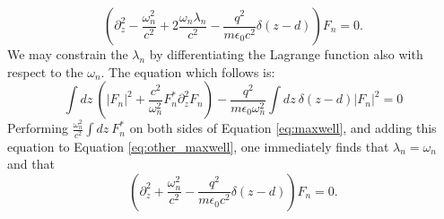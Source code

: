 \documentclass[aps,prb,onecolumn,preprint,
	groupedaddress,superscriptaddress,
	amsfonts,amssymb,amsmath,floatfix,
	citeautoscript]{revtex4-1}
\begin{document}
\begin{equation}\label{eq:maxwell}
\left(\partial_z^2-\frac{\omega^2_n}{c^2}+2\frac{\omega_n\lambda_n}{c^2}-\frac{q^2 }{m\epsilon_0 c^2}\delta(z-d)\right)F_n  = 0.
\end{equation}
We may constrain the $\lambda_n$ by differentiating the Lagrange function also with respect to the $\omega_n$. The equation which follows is:
\begin{equation}\label{eq:other_maxwell}
\int dz ~\left(|F_n|^2 + \frac{c^2}{\omega^2_n}F_n^*\partial_z^2F_n\right) - \frac{ q^2}{m\epsilon_0\omega^2_n} \int dz~\delta(z-d)|F_n|^2 = 0
\end{equation}
Performing $\frac{\omega_n^2}{c^2}\int dz~F_n^*$ on both sides of Equation \ref{eq:maxwell}, and adding this equation to Equation \ref{eq:other_maxwell}, one immediately finds that $\lambda_n = \omega_n$ and that
\begin{equation}\label{eq:final_maxwell}
\left(\partial_z^2+\frac{\omega^2_n}{c^2}-\frac{q^2 }{m\epsilon_0 c^2}\delta(z-d)\right)F_n  = 0.
\end{equation}
\end{document}
